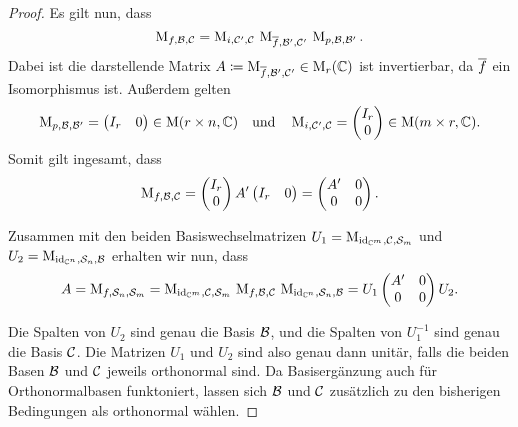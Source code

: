\begin{proof}
  Es gilt nun, dass
  \[
        \operatorname{M}_{f, \mathcal{B}, \mathcal{C}}
    =   \operatorname{M}_{i, \mathcal{C}', \mathcal{C}}
    \,  \operatorname{M}_{\overline{f}, \mathcal{B}', \mathcal{C}'}
    \,  \operatorname{M}_{p, \mathcal{B}, \mathcal{B}'}.
  \]
  Dabei ist die darstellende Matrix $A \coloneqq \operatorname{M}_{\overline{f}, \mathcal{B}', \mathcal{C}'} \in \operatorname{M}_{r}(\mathbb{C})$ ist invertierbar, da $\overline{f}$ ein Isomorphismus ist.
  Außerdem gelten
  \[
      \operatorname{M}_{p, \mathcal{B}, \mathcal{B}'}
    = \begin{pmatrix}
        I_r & 0
      \end{pmatrix}
      \in
      \operatorname{M}(r \times n, \mathbb{C})
    \quad
    \text{und}
    \quad
      \operatorname{M}_{i, \mathcal{C}', \mathcal{C}}
    = \begin{pmatrix}
        I_r \\
        0
      \end{pmatrix}
      \in
      \operatorname{M}(m \times r, \mathbb{C}).
  \]
  Somit gilt ingesamt, dass
  \[
    \operatorname{M}_{f, \mathcal{B}, \mathcal{C}}
    = \begin{pmatrix}
        I_r \\
        0
      \end{pmatrix}
      A'
      \begin{pmatrix}
        I_r & 0
      \end{pmatrix}
    = \begin{pmatrix}
        A' & 0  \\
        0  & 0
      \end{pmatrix}.
  \]
  
  Zusammen mit den beiden Basiswechselmatrizen $U_1 = \operatorname{M}_{\operatorname{id}_{\mathbb{C}^m}, \mathcal{C}, \mathcal{S}_m}$ und $U_2 = \operatorname{M}_{\operatorname{id}_{\mathbb{C}^n}, \mathcal{S}_n, \mathcal{B}}$ erhalten wir nun, dass
  \[
        A
    =   \operatorname{M}_{f, \mathcal{S}_n, \mathcal{S}_m}
    =   \operatorname{M}_{\operatorname{id}_{\mathbb{C}^m}, \mathcal{C}, \mathcal{S}_m}
    \,  \operatorname{M}_{f, \mathcal{B}, \mathcal{C}}
    \,  \operatorname{M}_{\operatorname{id}_{\mathbb{C}^n}, \mathcal{S}_n, \mathcal{B}}
    =   U_1
        \begin{pmatrix}
          A' & 0  \\
          0  & 0
        \end{pmatrix}
        U_2.
  \]
  
  Die Spalten von $U_2$ sind genau die Basis $\mathcal{B}$, und die Spalten von $U_1^{-1}$ sind genau die Basis $\mathcal{C}$.
  Die Matrizen $U_1$ und $U_2$ sind also genau dann unitär, falls die beiden Basen $\mathcal{B}$ und $\mathcal{C}$ jeweils orthonormal sind.
  Da Basisergänzung auch für Orthonormalbasen funktoniert, lassen sich $\mathcal{B}$ und $\mathcal{C}$ zusätzlich zu den bisherigen Bedingungen als orthonormal wählen.
\end{proof}


